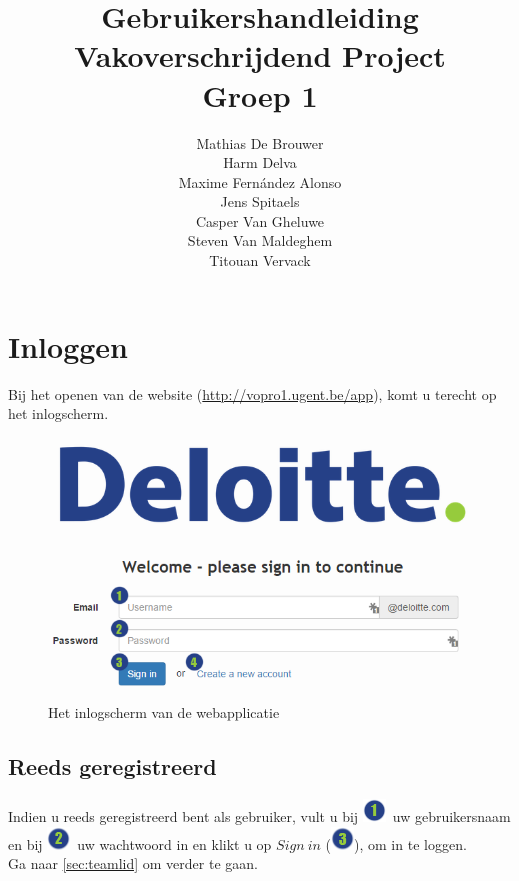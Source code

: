 \documentclass[a4paper,11pt]{article}
\newcommand{\one}{\includegraphics[scale=0.5]{Gebruikershandleiding_img/1.png}}
\newcommand{\two}{\includegraphics[scale=0.5]{Gebruikershandleiding_img/2.png}}
\newcommand{\three}{\includegraphics[scale=0.5]{Gebruikershandleiding_img/3.png}}
\begin{document}

\title{Gebruikershandleiding\\Vakoverschrijdend Project\\Groep 1}
\author{Mathias De Brouwer\\ Harm Delva\\ Maxime Fern\'andez Alonso\\ Jens Spitaels\\ Casper Van Gheluwe\\ Steven Van Maldeghem\\ Titouan Vervack}
\date{}
\maketitle
\tableofcontents
{}

\section{Inloggen}
\label{sec:login}
Bij het openen van de website (\url{http://vopro1.ugent.be/app}), komt u terecht op het inlogscherm.

\begin{figure}[H]
\centering
\includegraphics[scale=0.5]{Gebruikershandleiding_img/login.png}
\caption{Het inlogscherm van de webapplicatie}
\label{fig:login}
\end{figure}

\subsection{Reeds geregistreerd}
Indien u reeds geregistreerd bent als gebruiker, vult u bij \one\ uw gebruikersnaam en bij \two\ uw wachtwoord in en klikt u op $Sign\ in$ (\three), om in te loggen.\\
Ga naar \autoref{sec:teamlid} om verder te gaan.
\end{document}

